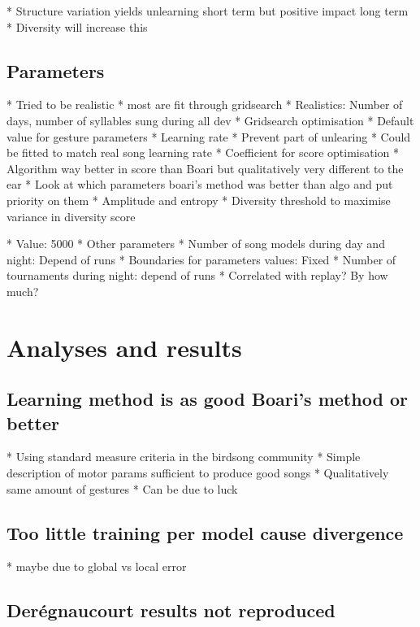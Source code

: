 \documentclass{report}
\begin{document}
  * Structure variation yields unlearning short term but positive impact
  long term
  * Diversity will increase this

\section{Parameters}\label{parameters}

  * Tried to be realistic
  * most are fit through gridsearch
  * Realistics: Number of days, number of syllables sung during all dev
  * Gridsearch optimisation
  * Default value for gesture parameters
  * Learning rate
        * Prevent part of unlearing
      * Could be fitted to match real song learning rate
      * Coefficient for score optimisation
    * Algorithm way better in score than Boari but qualitatively very
  different to the ear
  * Look at which parameters boari's method was better than algo and put
  priority on them
  * Amplitude and entropy
  * Diversity threshold to maximise variance in diversity score

        * Value: 5000
      * Other parameters
    * Number of song models during day and night: Depend of runs
  * Boundaries for parameters values: Fixed
  * Number of tournaments during night: depend of runs
        * Correlated with replay? By how much?

\chapter{Analyses and results}\label{analyses-and-results}

\section{Learning method is as good Boari's method or
better}\label{learning-method-is-as-good-boaris-method-or-better}

  * Using standard measure criteria in the birdsong community
  * Simple description of motor params sufficient to produce good songs
  * Qualitatively same amount of gestures
        * Can be due to luck

  \section{Too little training per model cause
divergence}\label{too-little-training-per-model-cause-divergence}

  * maybe due to global vs local error
\section{Derégnaucourt results not
reproduced}\label{deruxe9gnaucourt-results-not-reproduced}
\end{document}

